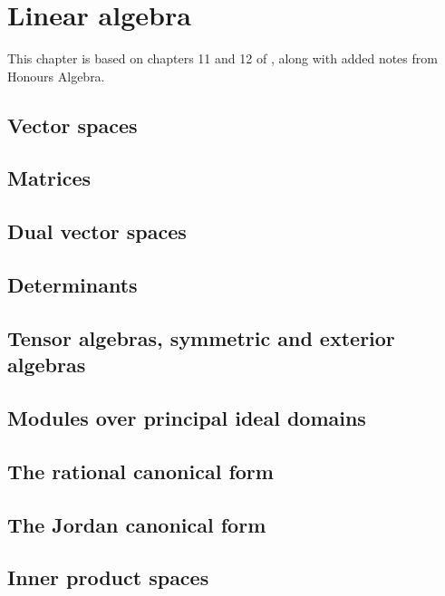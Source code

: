 \chapter{Linear algebra}\label{cha:linear-algebra}
This chapter is based on chapters 11 and 12 of \cite{Dummit:Abstract_Algebra}, along with added notes from Honours Algebra.

\section{Vector spaces}

\section{Matrices}

\section{Dual vector spaces}

\section{Determinants}

\section{Tensor algebras, symmetric and exterior algebras}

\section{Modules over principal ideal domains}

\section{The rational canonical form}

\section{The Jordan canonical form}

\section{Inner product spaces}

